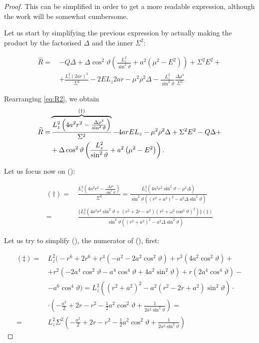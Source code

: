 \begin{proof}
	This can be simplified in order to get a more readable expression, although the work will be somewhat cumbersome.
	
	Let us start by simplifying the previous expression by actually making the product by the factorised $\Delta$ and the inner $\Sigma^2$:
	
	\begin{align}
	\widehat{R} =\,& -Q\Delta + \Delta\cos^2\vartheta\left( \frac{L_z^2}{\sin^2\vartheta} + a^2 (\mu^2 - E^2) \right) + \Sigma^2 E^2 + \nonumber \\
	&+ \frac{L_z^2 (2ar)^2}{\Sigma^2} - 2 E L_z 2ar  - \mu^2\rho^2\Delta - \frac{L_z^2}{\sin^2\vartheta}\frac{\Delta\rho^4}{\Sigma^2}
	\label{eq:R2}
	\end{align}
	
	Rearranging \autoref{eq:R2}, we obtain
	\begin{align}
	\widehat{R} =& \overbrace{\frac{L_z^2 \left(4a^2r^2 - \frac{\Delta\rho^4}{\sin^2\vartheta}\right)}{\Sigma^2}}^{\text{(\dag)}} - 4 a r E L_z - \mu^2 \rho^2 \Delta + \Sigma^2 E^2 - Q \Delta + \nonumber \\ 
	&+ \Delta\cos^2\vartheta\left(\frac{L_z^2}{\sin^2\vartheta} + a^2\left(\mu^2 - E^2\right)\right).
	\end{align}
	
	Let us focus now on (\dag):
	
	\begin{align}
	(\dag) =\,& \frac{L_z^2 \left(4a^2r^2 - \frac{\Delta\rho^4}{\sin^2\vartheta}\right)}{\Sigma^2} = \frac{L_z^2 \left(4a^2r^2\sin^2\vartheta - \rho^4\Delta \right)}{\sin^2\vartheta\left(\left(r^2+a^2\right)^2 - a^2\Delta\sin^2\vartheta\right)} \nonumber \\
	=\,& \frac{\Biggl\{L_z^2\left(4a^2r^2\sin^2\vartheta+\left(r^2+2r-a^2\right)\left(r^2+\omega^2\cos^2\vartheta\right)^2\right)\Biggr\}(\ddag)}{\sin^2\vartheta\left(\left(r^2+a^2\right)^2-a^2\Delta\sin^2\vartheta\right)}
	\end{align}
	
	Let us try to simplify (\ddag), the numerator of (\dag), first:
	
	\begin{align}
	(\ddag) =\,& L_z^2 \Biggl( -r^6 + 2r^6 + r^4 \left( -a^2 - 2a^2\cos^2\vartheta \right) + r^3\left(4 a^2 \cos^2\vartheta \right) + \nonumber \\
	&+ r^2 \left( -2a^4\cos^2\vartheta - a^4\cos^4\vartheta + 4a^2\sin^2\vartheta\right) + r\left(2a^4\cos^4\vartheta\right) - \nonumber \\
	&- a^6\cos^4\vartheta \Biggr) = L_z^2 \left( \left(r^2 + a^2\right)^2 - a^2 \left(r^2 - 2r + a^2\right)\sin^2\vartheta \right) \cdot \nonumber \\
	&\cdot \left( -\frac{a^2}{2} + 2r - r^2 - \frac{1}{2}a^2\cos^2\vartheta + \frac{1}{2a^2\sin^2\vartheta} \right) = \nonumber\\
	=\,& L_z^2 \Sigma^2 \left( -\frac{a^2}{2} + 2r - r^2 - \frac{1}{2}a^2\cos^2\vartheta + \frac{1}{2a^2\sin^2\vartheta} \right)
	\end{align}
	

\end{proof}
